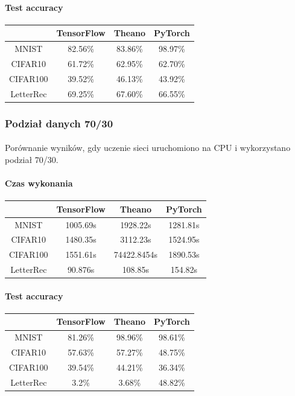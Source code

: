 \documentclass[a4paper,11pt]{article}
\begin{document}
\paragraph{Test accuracy}
\begin{tabular}{|c|c|c|c|}
\hline &TensorFlow & Theano & PyTorch \\ 
\hline MNIST &82.56\% &83.86\%  &98.97\%  \\ 
\hline CIFAR10 &61.72\%  &62.95\%  &62.70\%  \\ 
\hline CIFAR100 &39.52\% &46.13\%  &43.92\%  \\ 
\hline LetterRec &69.25\% &67.60\%  &66.55\%  \\ 
\hline
\end{tabular}
\subsubsection{Podział danych 70/30}
\paragraph{}Porównanie wyników, gdy uczenie sieci uruchomiono na CPU i wykorzystano podział 70/30.
\paragraph{Czas wykonania}
\begin{tabular}{|c|c|c|c|}
\hline &TensorFlow & Theano & PyTorch \\ 
\hline MNIST &1005.69s &1928.22s  &1281.81s  \\ 
\hline CIFAR10 &1480.35s &3112.23s  &1524.95s  \\ 
\hline CIFAR100 &1551.61s &74422.8454s  &1890.53s  \\ 
\hline LetterRec &90.876s &108.85s  &154.82s  \\ 
\hline
\end{tabular}
\paragraph{Test accuracy}
\begin{tabular}{|c|c|c|c|}
\hline &TensorFlow & Theano & PyTorch \\ 
\hline MNIST &81.26\% &98.96\%  &98.61\%  \\ 
\hline CIFAR10 &57.63\%  &57.27\%  &48.75\%  \\ 
\hline CIFAR100 &39.54\% &44.21\%  &36.34\%  \\ 
\hline LetterRec &3.2\% &3.68\%  &48.82\%  \\ 
\hline
\end{tabular}
\end{document}
